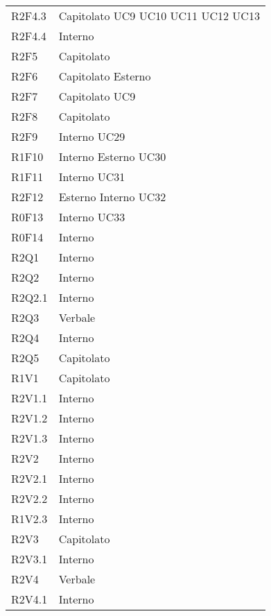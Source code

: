 \begin{center}
\begin{longtable}{  p{5cm} p{5cm} }
		R2F4.3 & Capitolato \newline UC9 \newline UC10 \newline UC11 \newline UC12 \newline UC13 \\
		R2F4.4 & Interno \\
		R2F5 & Capitolato \\
		R2F6 & Capitolato \newline Esterno \\
		R2F7 & Capitolato \newline UC9 \\
		R2F8 & Capitolato \\
		R2F9 & Interno \newline UC29 \\
		R1F10 & Interno \newline Esterno \newline UC30 \\
		R1F11 & Interno \newline UC31 \\
		R2F12 & Esterno \newline Interno \newline UC32 \\
		R0F13 & Interno \newline UC33 \\
		R0F14 & Interno \\
		R2Q1 & Interno \\
		R2Q2 & Interno \\
		R2Q2.1 & Interno \\
		R2Q3 & Verbale \\
		R2Q4 & Interno \\
		R2Q5 & Capitolato \\
		R1V1 & Capitolato \\
		R2V1.1 & Interno \\
		R2V1.2 & Interno \\
		R2V1.3 & Interno \\
		R2V2 & Interno \\
		R2V2.1 & Interno \\
		R2V2.2 & Interno \\
		R1V2.3 & Interno \\
		R2V3 & Capitolato \\
		R2V3.1 & Interno \\
		R2V4 & Verbale \\
		R2V4.1 & Interno \\

\end{longtable}
\end{center}

